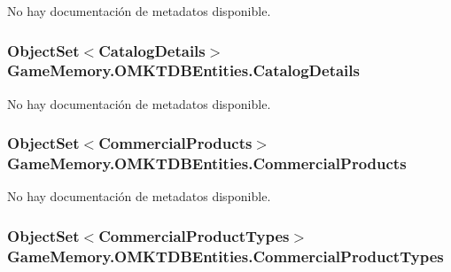 No hay documentación de metadatos disponible. 

\hypertarget{class_game_memory_1_1_o_m_k_t_d_b_entities_a69952a3a5e283da5b13c6e2ca8197a5c}{
\subsubsection[{Catalog\-Details}]{\setlength{\rightskip}{0pt plus 5cm}Object\-Set$<${\bf Catalog\-Details}$>$ Game\-Memory.\-O\-M\-K\-T\-D\-B\-Entities.\-Catalog\-Details\hspace{0.3cm}{\ttfamily [get]}}}\label{class_game_memory_1_1_o_m_k_t_d_b_entities_a69952a3a5e283da5b13c6e2ca8197a5c}


No hay documentación de metadatos disponible. 

\hypertarget{class_game_memory_1_1_o_m_k_t_d_b_entities_a8252382d058a524b5788a0cc7aa46fc1}{
\subsubsection[{Commercial\-Products}]{\setlength{\rightskip}{0pt plus 5cm}Object\-Set$<${\bf Commercial\-Products}$>$ Game\-Memory.\-O\-M\-K\-T\-D\-B\-Entities.\-Commercial\-Products\hspace{0.3cm}{\ttfamily [get]}}}\label{class_game_memory_1_1_o_m_k_t_d_b_entities_a8252382d058a524b5788a0cc7aa46fc1}


No hay documentación de metadatos disponible. 

\hypertarget{class_game_memory_1_1_o_m_k_t_d_b_entities_a203829329349d2b48949ba7b63438281}{
\subsubsection[{Commercial\-Product\-Types}]{\setlength{\rightskip}{0pt plus 5cm}Object\-Set$<${\bf Commercial\-Product\-Types}$>$ Game\-Memory.\-O\-M\-K\-T\-D\-B\-Entities.\-Commercial\-Product\-Types\hspace{0.3cm}{\ttfamily [get]}}}\label{class_game_memory_1_1_o_m_k_t_d_b_entities_a203829329349d2b48949ba7b63438281}


